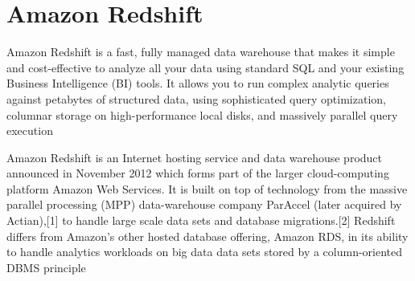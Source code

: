 \section{Amazon Redshift}

Amazon Redshift is a fast, fully managed data warehouse that makes it simple 
and cost-effective to analyze all your data using standard SQL and your 
existing Business Intelligence (BI) tools. It allows you to run complex 
analytic queries against petabytes of structured data, using sophisticated 
query optimization, columnar storage on high-performance local disks, and 
massively parallel query execution \cite{Amazon Redshift}

Amazon Redshift is an Internet hosting service and data warehouse product 
announced in November 2012 which forms part of the larger cloud-computing 
platform Amazon Web Services. It is built on top of technology from the 
massive parallel processing (MPP) data-warehouse company ParAccel 
(later acquired by Actian),[1] to handle large scale data sets and database 
migrations.[2] Redshift differs from Amazon's other hosted database offering, 
Amazon RDS, in its ability to handle analytics workloads on big data data sets 
stored by a column-oriented DBMS principle \cite{AmazonWiki}

